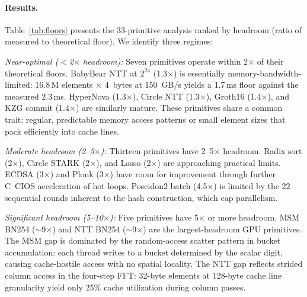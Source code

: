 \paragraph{Results.}
Table~\ref{tab:floors} presents the 33-primitive analysis ranked by headroom (ratio of measured to theoretical floor).
We identify three regimes:

\emph{Near-optimal ($<$2$\times$ headroom):}
Seven primitives operate within 2$\times$ of their theoretical floors.
BabyBear NTT at $2^{24}$ (1.3$\times$) is essentially memory-bandwidth-limited: 16.8\,M elements $\times$ 4~bytes at 150~GB/s yields a 1.7\,ms floor against the measured 2.3\,ms.
HyperNova (1.3$\times$), Circle NTT (1.3$\times$), Groth16 (1.4$\times$), and KZG commit (1.4$\times$) are similarly mature.
These primitives share a common trait: regular, predictable memory access patterns or small element sizes that pack efficiently into cache lines.

\emph{Moderate headroom (2--5$\times$):}
Thirteen primitives have 2--5$\times$ headroom.
Radix sort (2$\times$), Circle STARK (2$\times$), and Lasso (2$\times$) are approaching practical limits.
ECDSA (3$\times$) and Plonk (3$\times$) have room for improvement through further C~CIOS acceleration of hot loops.
Poseidon2 batch (4.5$\times$) is limited by the 22 sequential rounds inherent to the hash construction, which cap parallelism.

\emph{Significant headroom (5--10$\times$):}
Five primitives have 5$\times$ or more headroom.
MSM BN254 ($\sim$9$\times$) and NTT BN254 ($\sim$9$\times$) are the largest-headroom GPU primitives.
The MSM gap is dominated by the random-access scatter pattern in bucket accumulation: each thread writes to a bucket determined by the scalar digit, causing cache-hostile access with no spatial locality.
The NTT gap reflects strided column access in the four-step FFT: 32-byte elements at 128-byte cache line granularity yield only 25\% cache utilization during column passes.

